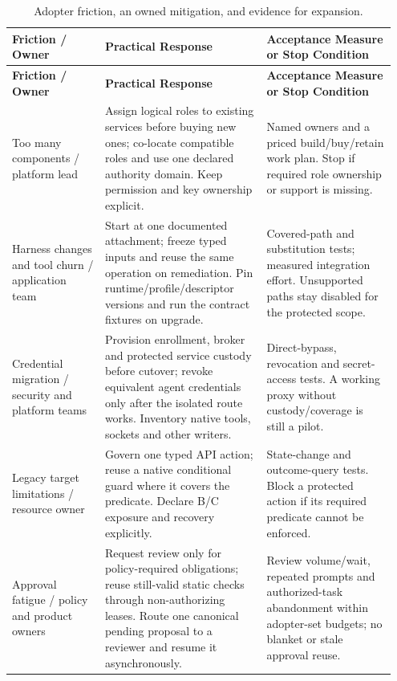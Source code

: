 {\small
\begin{longtable}{@{}L{0.23\linewidth}L{0.40\linewidth}L{0.32\linewidth}@{}}
\caption{Adopter friction, an owned mitigation, and evidence for expansion.}
\label{tab:adoption-frictions}\\
\toprule
\textbf{Friction / Owner} & \textbf{Practical Response} & \textbf{Acceptance Measure or Stop Condition}\\
\midrule
\endfirsthead
\toprule
\textbf{Friction / Owner} & \textbf{Practical Response} & \textbf{Acceptance Measure or Stop Condition}\\
\midrule
\endhead
\bottomrule
\endfoot
Too many components / platform lead & Assign logical roles to existing services before buying new ones; co-locate compatible roles and use one declared authority domain. Keep permission and key ownership explicit. & Named owners and a priced build/buy/retain work plan. Stop if required role ownership or support is missing.\\
\addlinespace
Harness changes and tool churn / application team & Start at one documented attachment; freeze typed inputs and reuse the same operation on remediation. Pin runtime/profile/descriptor versions and run the contract fixtures on upgrade. & Covered-path and substitution tests; measured integration effort. Unsupported paths stay disabled for the protected scope.\\
\addlinespace
Credential migration / security and platform teams & Provision enrollment, broker and protected service custody before cutover; revoke equivalent agent credentials only after the isolated route works. Inventory native tools, sockets and other writers. & Direct-bypass, revocation and secret-access tests. A working proxy without custody/coverage is still a pilot.\\
\addlinespace
Legacy target limitations / resource owner & Govern one typed API action; reuse a native conditional guard where it covers the predicate. Declare B/C exposure and recovery explicitly. & State-change and outcome-query tests. Block a protected action if its required predicate cannot be enforced.\\
\addlinespace
Approval fatigue / policy and product owners & Request review only for policy-required obligations; reuse still-valid static checks through non-authorizing leases. Route one canonical pending proposal to a reviewer and resume it asynchronously. & Review volume/wait, repeated prompts and authorized-task abandonment within adopter-set budgets; no blanket or stale approval reuse.\\

\end{longtable}}
